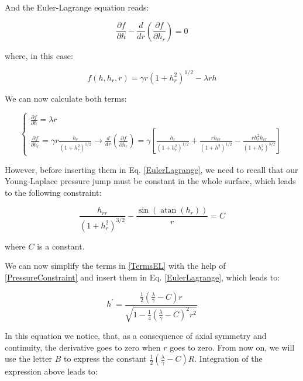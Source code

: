 And the Euler-Lagrange equation reads:

\begin{equation}
\frac{\partial f}{\partial h} - \frac{d}{d r}\left(\frac{\partial f}{\partial h_r}\right) = 0
\end{equation}

where, in this case:

\begin{equation}
f\left(h, h_r, r\right)=\gamma r\left(1+h_r^2\right)^{1 / 2}-\lambda r h
\label{EulerLagrange}
\end{equation}

We can now calculate both terms:

\begin{equation}
\left\{\begin{array}{l}{\frac{\partial f}{\partial h}=\lambda r} \\ {\frac{\partial f}{\partial h_r}=\gamma r \frac{h_r}{\left(1+h_r^2\right)^{1/2}} \rightarrow \frac{d}{d r}\left(\frac{\partial f}{\partial h_r}\right)=\gamma\left[\frac{h_r}{\left(1+h_r^{2}\right)^{1/2}}+\frac{r h_{rr}}{\left(1+h^{2}\right)^{1 / 2}}-\frac{r h_r^{2} h_{rr}}{\left(1+h_r^{2}\right)^{3 / 2}}\right]}\end{array}\right.
\label{TermsEL}
\end{equation}

However, before inserting them in Eq. \ref{EulerLagrange}, we need to recall that our Young-Laplace pressure jump must be constant in the whole surface, which leads to the following constraint:

\begin{equation}
\frac{h_{rr}}{\left(1+h_r^{2}\right)^{3 / 2}}-\frac{\sin \left(\operatorname{atan}\left(h_r\right)\right)}{r}=C
\label{PressureConstraint}
\end{equation}

where $C$ is a constant.

We can now simplify the terms in \ref{TermsEL} with the help of \ref{PressureConstraint} and insert them in Eq. \ref{EulerLagrange}, which leads to:

\begin{equation}
h^{\prime}=\frac{\frac{1}{2}\left(\frac{\lambda}{\gamma}-C\right) r}{\sqrt{1-\frac{1}{4}\left(\frac{\lambda}{\gamma}-C\right)^{2} r^{2}}}
\end{equation}

In this equation we notice, that, as a consequence of axial symmetry and continuity, the derivative goes to zero when $r$ goes to zero. From now on, we will use the letter $B$ to express the constant $\frac{1}{2}\left(\frac{\lambda}{\gamma}-C\right) R$. Integration of the expression above leads to:

